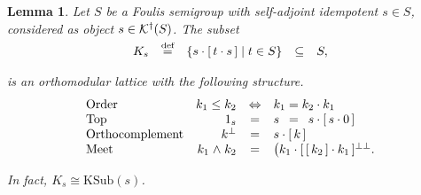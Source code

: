 \documentclass{article}
\newtheorem{lemma}[theorem]{Lemma}
\newcommand{\KSub}{\ensuremath{\mathrm{KSub}}}
\newcommand{\dagKaroubi}[1]{{\cal K}^{\dag}(#1)}
\newcommand{\set}[2]{\{#1\;|\;#2\}}
\newcommand{\conjun}{\mathrel{\wedge}}
\newcommand{\sai}[1]{[\,#1\,]}
\begin{document}
\begin{lemma}
\label{FoulisOMKerLem}
Let $S$ be a Foulis semigroup with self-adjoint idempotent $s\in S$,
considered as object $s\in\dagKaroubi{S}$. The subset
$$\begin{array}{rcccl}
K_{s}
& \smash{\stackrel{\textrm{def}}{=}} &
\set{s\cdot \sai{t\cdot s}}{t\in S} 
& \subseteq & 
S,
\end{array}$$

\noindent is an orthomodular lattice with the following structure.
$$\begin{array}{lrcl}
\mbox{Order} & k_{1}\leq k_{2} & \Leftrightarrow & k_{1} = k_{2}\cdot k_{1} \\
\mbox{Top} & 1_{s} & = & s \hspace*{\arraycolsep} = \hspace*{\arraycolsep}
   s\cdot \sai{s\cdot 0} \\
\mbox{Orthocomplement} & k^{\perp} & = & s\cdot \sai{k} \\
\mbox{Meet} & k_{1} \conjun k_{2} & = &  
   \big(k_{1} \cdot \sai{\sai{k_{2}}\cdot k_{1}}^{\perp\perp}.
\end{array}$$

\noindent In fact, $K_{s} \cong \KSub(s)$.
\end{lemma}
\end{document}
